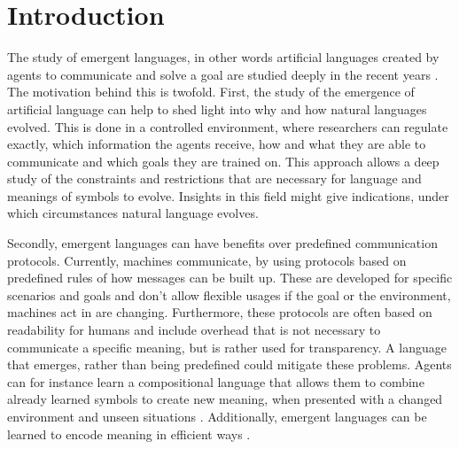 \section{Introduction}
\label{sec:introduction}
The study of emergent languages, in other words artificial languages created by agents to communicate and solve a goal are studied deeply in the recent years \citep{Kirby2002,Kirby2008,Steels2009,Lazaridou2017,Baroni2020,Baroni2022}.
The motivation behind this is twofold.
First, the study of the emergence of artificial language can help to shed light into why and how natural languages evolved.
This is done in a controlled environment, where researchers can regulate exactly, which information the agents receive, how and what they are able to communicate and which goals they are trained on.
This approach allows a deep study of the constraints and restrictions that are necessary for language and meanings of symbols to evolve.
Insights in this field might give indications, under which circumstances natural language evolves.

Secondly, emergent languages can have benefits over predefined communication protocols.
Currently, machines communicate, by using protocols based on predefined rules of how messages can be built up.
These are developed for specific scenarios and goals and don't allow flexible usages if the goal or the environment, machines act in are changing.
Furthermore, these protocols are often based on readability for humans and include overhead that is not necessary to communicate a specific meaning, but is rather used for transparency.
A language that emerges, rather than being predefined could mitigate these problems.
Agents can for instance learn a compositional language that allows them to combine already learned symbols to create new meaning, when presented with a changed environment and unseen situations \citep{Kharitonov2020,Lazaridou2018,Gupta2020}.
Additionally, emergent languages can be learned to encode meaning in efficient ways \citep{Chaabouni2019,Zaslavsky2018}.

